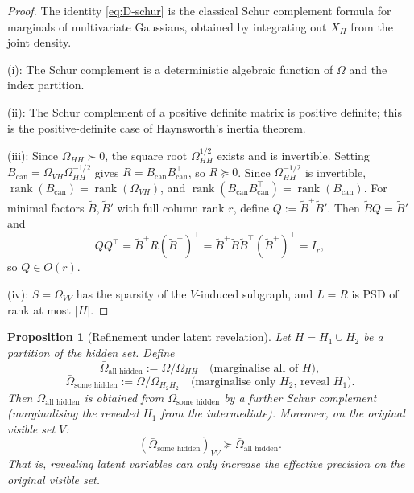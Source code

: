 \documentclass[11pt,a4paper]{article}
\numberwithin{equation}{section}
\DeclareMathOperator{\rank}{rank}
\theoremstyle{thmcompact}
\newtheorem{proposition}[theorem]{Proposition}
\theoremstyle{remark}
\begin{document}
\begin{proof}
The identity \eqref{eq:D-schur} is the classical Schur complement formula for marginals of multivariate Gaussians, obtained by integrating out $X_H$ from the joint density.

(i): The Schur complement is a deterministic algebraic function of $\Omega$ and the index partition.

(ii): The Schur complement of a positive definite matrix is positive definite; this is the positive-definite case of Haynsworth's inertia theorem.

(iii): Since $\Omega_{HH} \succ 0$, the square root $\Omega_{HH}^{1/2}$ exists and is invertible. Setting $B_{\mathrm{can}} = \Omega_{VH}\Omega_{HH}^{-1/2}$ gives $R = B_{\mathrm{can}} B_{\mathrm{can}}^\top$, so $R \succeq 0$. Since $\Omega_{HH}^{-1/2}$ is invertible, $\rank(B_{\mathrm{can}}) = \rank(\Omega_{VH})$, and $\rank(B_{\mathrm{can}}B_{\mathrm{can}}^\top) = \rank(B_{\mathrm{can}})$. For minimal factors $\widetilde B, \widetilde B'$ with full column rank $r$, define $Q := \widetilde B^{+}\widetilde B'$. Then $\widetilde BQ = \widetilde B'$ and
\[
QQ^\top = \widetilde B^{+}R(\widetilde B^{+})^\top = \widetilde B^{+}\widetilde B\widetilde B^\top(\widetilde B^{+})^\top = I_r,
\]
so $Q \in O(r)$.

(iv): $S = \Omega_{VV}$ has the sparsity of the $V$-induced subgraph, and $L = R$ is PSD of rank at most $|H|$.
\end{proof}

\begin{proposition}[Refinement under latent revelation]\label{prop:bridge-D-refine}
Let $H = H_1 \cup H_2$ be a partition of the hidden set. Define
\[
\bar{\Omega}_{\text{all hidden}} := \Omega/\Omega_{HH} \quad \text{(marginalise all of }H\text{)},
\]
\[
\bar{\Omega}_{\text{some hidden}} := \Omega/\Omega_{H_2 H_2} \quad \text{(marginalise only }H_2\text{, reveal }H_1\text{)}.
\]
Then $\bar{\Omega}_{\text{all hidden}}$ is obtained from $\bar{\Omega}_{\text{some hidden}}$ by a further Schur complement (marginalising the revealed $H_1$ from the intermediate). Moreover, on the original visible set $V$:
\begin{equation}\label{eq:D-refine}
(\bar{\Omega}_{\text{some hidden}})_{VV} \succeq \bar{\Omega}_{\text{all hidden}}.
\end{equation}
That is, revealing latent variables can only increase the effective precision on the original visible set.
\end{proposition}
\end{document}

